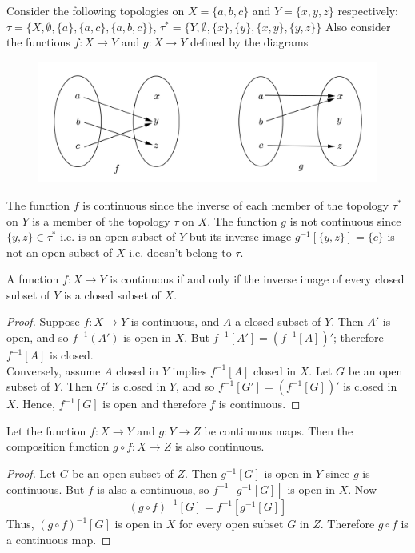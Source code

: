 \begin{example}
Consider the following topologies on $X=\{ a,b,c\}$ and $Y=\{x,y,z\}$ respectively: $\tau =\{X,\emptyset,\{a\},\{a,c\},\{a,b,c\}\}$, $\tau^*=\{Y,\emptyset,\{x\},\{y\},\{x,y\},\{y,z\}\}$ Also consider the functions $f:X\rightarrow Y$ and $g:X\rightarrow Y$ defined by the diagrams
\begin{figure}[hbt!]
\centering
\includegraphics[width=.7\textwidth]{./images/cont1.jpg}
\end{figure}


The function $f$ is continuous since the inverse of each member of the topology $\tau^*$ on $Y$ is a member of the topology $\tau$ on $X$. The function $g$ is not continuous since $\{y,z\}\in \tau^*$ i.e. is an open subset of $Y$ but its inverse image $g^{-1}[\{y,z\}]=\{c\}$ is not an open subset of $X$ i.e. doesn't belong to $\tau$.
\end{example}

\begin{proposition}
A function $f:X \rightarrow Y$ is continuous if and only if the inverse image of every closed subset of $Y$ is a closed subset of $X$.
\end{proposition}
\begin{proof}
 Suppose $f:X\rightarrow Y$ is continuous, and $A$ a closed subset of $Y$. Then $A'$ is open, and so $f^{-1}(A')$ is open in $X$. But $f^{-1}[A']=(f^{-1}[A])'$; therefore $f^{-1}[A]$ is closed.\\
Conversely, assume $A$ closed in $Y$ implies $f^{-1}[A]$ closed in $X$. Let $G$ be an open subset of $Y$. Then $G'$ is closed in $Y$, and so $f^{-1}[G']=(f^{-1}[G])'$ is closed in $X$. Hence, $f^{-1}[G]$ is open and therefore $f$ is continuous.
\end{proof}

\begin{proposition}
Let the function $f:X\rightarrow Y$ and $g:Y\rightarrow Z$ be continuous maps. Then the composition function $g\circ f:X\rightarrow Z$ is also continuous.
\end{proposition}

\begin{proof}
Let $G$ be an open subset of $Z$. Then $g^{-1}[G]$ is open in $Y$ since $g$ is continuous. But $f$ is also a continuous, so $f^{-1}[g^{-1}[G]]$ is open in $X$. Now
$$ (g\circ f)^{-1}[G]=f^{-1}[g^{-1}[G]]$$
Thus, $(g\circ f)^{-1}[G]$ is open in $X$ for every open subset $G$ in $Z$. Therefore $g\circ f$ is a continuous map.

\end{proof}

